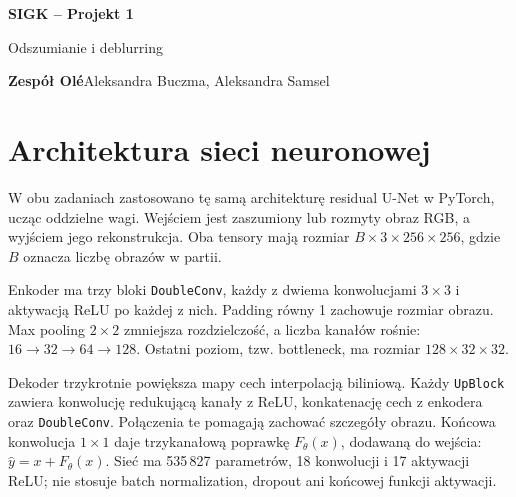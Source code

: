 \documentclass[11pt,a4paper]{article}
\begin{document}
\begin{center}
  {\LARGE\bfseries SIGK -- Projekt 1}\par
  \vspace{4pt}
  {\large Odszumianie i deblurring}\par
  \vspace{4pt}
  \textbf{Zespół Olé}\quad Aleksandra Buczma, Aleksandra Samsel
\end{center}

\begingroup\small

\section*{Architektura sieci neuronowej}
W obu zadaniach zastosowano tę samą architekturę residual U-Net w PyTorch,
ucząc oddzielne wagi. Wejściem jest zaszumiony lub rozmyty obraz RGB,
a wyjściem jego rekonstrukcja. Oba tensory mają rozmiar
$B\times3\times256\times256$, gdzie $B$ oznacza liczbę obrazów w partii.

Enkoder ma trzy bloki \texttt{DoubleConv}, każdy z dwiema konwolucjami
$3\times3$ i aktywacją ReLU po każdej z nich. Padding równy 1 zachowuje
rozmiar obrazu. Max pooling $2\times2$ zmniejsza rozdzielczość, a liczba
kanałów rośnie: $16\rightarrow32\rightarrow64\rightarrow128$.
Ostatni poziom, tzw. bottleneck, ma rozmiar $128\times32\times32$.

Dekoder trzykrotnie powiększa mapy cech interpolacją biliniową.
Każdy \texttt{UpBlock} zawiera konwolucję redukującą kanały z ReLU,
konkatenację cech z enkodera oraz \texttt{DoubleConv}.
Połączenia te pomagają zachować szczegóły obrazu.
Końcowa konwolucja $1\times1$ daje trzykanałową poprawkę $F_\theta(x)$,
dodawaną do wejścia: $\hat{y}=x+F_\theta(x)$.
Sieć ma 535\,827 parametrów, 18 konwolucji i 17 aktywacji ReLU;
nie stosuje batch normalization, dropout ani końcowej funkcji aktywacji.
\end{document}
